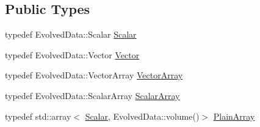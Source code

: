 \subsection*{Public Types}
\begin{DoxyCompactItemize}
\item 
typedef Evolved\+Data\+::\+Scalar \mbox{\hyperlink{classregu_system_aca8ee2c387943164ee3ea68370fc3ac0}{Scalar}}
\item 
typedef Evolved\+Data\+::\+Vector \mbox{\hyperlink{classregu_system_a809e01e54818f87ef4cdd47953db9e7d}{Vector}}
\item 
typedef Evolved\+Data\+::\+Vector\+Array \mbox{\hyperlink{classregu_system_aa4ecefb5c437230b994171e231450be8}{Vector\+Array}}
\item 
typedef Evolved\+Data\+::\+Scalar\+Array \mbox{\hyperlink{classregu_system_a90aade4ee474e3c49df3551515d5e7ef}{Scalar\+Array}}
\item 
typedef std\+::array$<$ \mbox{\hyperlink{classregu_system_aca8ee2c387943164ee3ea68370fc3ac0}{Scalar}}, Evolved\+Data\+::volume()$>$ \mbox{\hyperlink{classregu_system_ae2ca73edf865e016a858b694c1d2b49a}{Plain\+Array}}
\end{DoxyCompactItemize}
